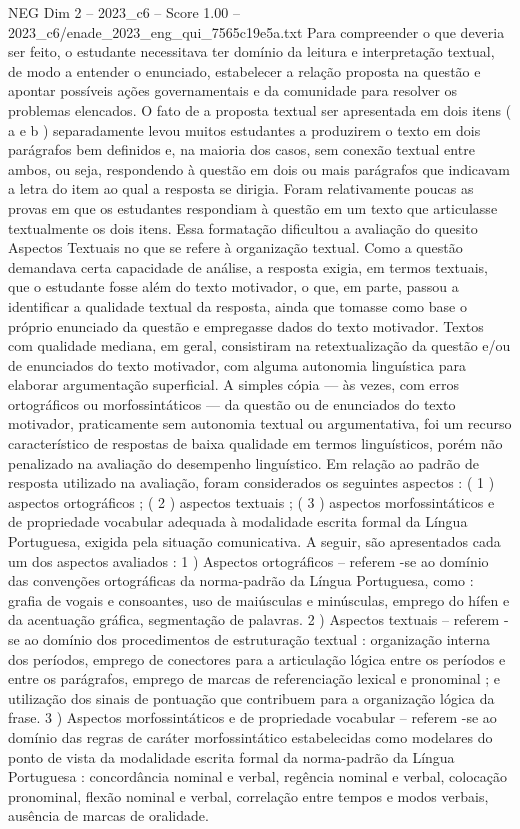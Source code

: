 \begin{textsample}{NEG Dim 2 – 2023\_c6 – Score 1.00 – 2023\_c6/enade\_2023\_eng\_qui\_7565c19e5a.txt}
Para compreender o que deveria ser feito, o estudante necessitava ter domínio da leitura e interpretação textual, de modo a entender o enunciado, estabelecer a relação proposta na questão e apontar possíveis ações governamentais e da comunidade para resolver os problemas elencados.
O fato de a proposta textual ser apresentada em dois itens ( a e b ) separadamente levou muitos estudantes a produzirem o texto em dois parágrafos bem definidos e, na maioria dos casos, sem conexão textual entre ambos, ou seja, respondendo à questão em dois ou mais parágrafos que indicavam a letra do item ao qual a resposta se dirigia.
Foram relativamente poucas as provas em que os estudantes respondiam à questão em um texto que articulasse textualmente os dois itens.
Essa formatação dificultou a avaliação do quesito Aspectos Textuais no que se refere à organização textual.
Como a questão demandava certa capacidade de análise, a resposta exigia, em termos textuais, que o estudante fosse além do texto motivador, o que, em parte, passou a identificar a qualidade textual da resposta, ainda que tomasse como base o próprio enunciado da questão e empregasse dados do texto motivador.
Textos com qualidade mediana, em geral, consistiram na retextualização da questão e/ou de enunciados do texto motivador, com alguma autonomia linguística para elaborar argumentação superficial.
A simples cópia — às vezes, com erros ortográficos ou morfossintáticos — da questão ou de enunciados do texto motivador, praticamente sem autonomia textual ou argumentativa, foi um recurso característico de respostas de baixa qualidade em termos linguísticos, porém não penalizado na avaliação do desempenho linguístico.
Em relação ao padrão de resposta utilizado na avaliação, foram considerados os seguintes aspectos : ( 1 ) aspectos ortográficos ; ( 2 ) aspectos textuais ; ( 3 ) aspectos morfossintáticos e de propriedade vocabular adequada à modalidade escrita formal da Língua Portuguesa, exigida pela situação comunicativa.
A seguir, são apresentados cada um dos aspectos avaliados : 1 ) Aspectos ortográficos – referem -se ao domínio das convenções ortográficas da norma-padrão da Língua Portuguesa, como : grafia de vogais e consoantes, uso de maiúsculas e minúsculas, emprego do hífen e da acentuação gráfica, segmentação de palavras. 2 ) Aspectos textuais – referem -se ao domínio dos procedimentos de estruturação textual : organização interna dos períodos, emprego de conectores para a articulação lógica entre os períodos e entre os parágrafos, emprego de marcas de referenciação lexical e pronominal ; e utilização dos sinais de pontuação que contribuem para a organização lógica da frase. 3 ) Aspectos morfossintáticos e de propriedade vocabular – referem -se ao domínio das regras de caráter morfossintático estabelecidas como modelares do ponto de vista da modalidade escrita formal da norma-padrão da Língua Portuguesa : concordância nominal e verbal, regência nominal e verbal, colocação pronominal, flexão nominal e verbal, correlação entre tempos e modos verbais, ausência de marcas de oralidade.

\end{textsample}
